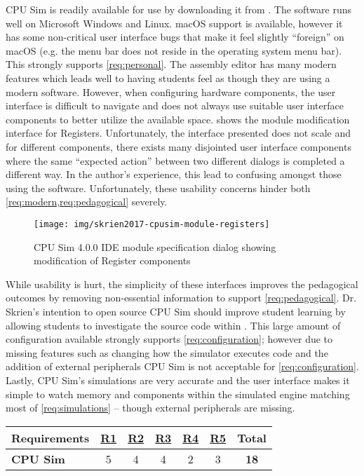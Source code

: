 CPU Sim is readily available for use by downloading it from \cite{Skrien2017}. The software runs well on Microsoft Windows and Linux. macOS support is available, however it has some non-critical user interface bugs that make it feel slightly ``foreign'' on macOS (e.g. the menu bar does not reside in the operating system menu bar). This strongly supports \cref{req:personal}. The assembly editor has many modern features which leads well to having students feel as though they are using a modern software. However, when configuring hardware components, the user interface is difficult to navigate and does not always use suitable user interface components to better utilize the available space.  shows the module modification interface for Registers. Unfortunately, the interface presented does not scale and for different components, there exists many disjointed user interface components where the same ``expected action'' between two different dialogs is completed a different way. In the author's experience, this lead to confusing amongst those using the software. Unfortunately, these usability concerns hinder both \cref{req:modern,req:pedagogical} severely. 

\begin{figure}[th!]
    \centering
    \texttt{[image: img/skrien2017-cpusim-module-registers]}
    \caption{CPU Sim 4.0.0 IDE module specification dialog showing modification of Register components \cite{Skrien2017}}
    \label{fig:skrien2017-cpusim-module-registers}
\end{figure}

While usability is hurt, the simplicity of these interfaces improves the pedagogical outcomes by removing non-essential information to support \cref{req:pedagogical}. Dr. Skrien's intention to open source CPU Sim should improve student learning by allowing students to investigate the source code within \cite{Skrien2016,Coppola2004,Koohang2005}. This large amount of configuration available strongly supports \cref{req:configuration}; however due to missing features such as changing how the simulator executes code and the addition of external peripherals CPU Sim is not acceptable for \cref{req:configuration}. Lastly, CPU Sim's simulations are very accurate and the user interface makes it simple to watch memory and components within the simulated engine matching most of \cref{req:simulations} -- though external peripherals are missing.

\begin{table}[h!]
    \centering
    \begin{tabular}{lcccccc}
        \textbf{Requirements} & \textbf{\hyperref[req:personal]{R1}} & \textbf{\hyperref[req:configuration]{R2}} & \textbf{\hyperref[req:pedagogical]{R3}} & \textbf{\hyperref[req:simulations]{R4}} & \textbf{\hyperref[req:modern]{R5}} & \textbf{Total} \\ \hline
        \textbf{CPU Sim \cite{Skrien2001, Skrien2001}}
        & 5 & 4 & 4 & 2 & 3 & \textbf{18} \\
    \end{tabular}
\end{table}

